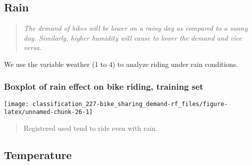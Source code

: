 \documentclass[]{book}
\newenvironment{Shaded}{\begin{snugshade}}{\end{snugshade}}
\newcommand{\DataTypeTok}[1]{\textcolor[rgb]{0.13,0.29,0.53}{#1}}
\newcommand{\DecValTok}[1]{\textcolor[rgb]{0.00,0.00,0.81}{#1}}
\newcommand{\KeywordTok}[1]{\textcolor[rgb]{0.13,0.29,0.53}{\textbf{#1}}}
\newcommand{\NormalTok}[1]{#1}
\newcommand{\OperatorTok}[1]{\textcolor[rgb]{0.81,0.36,0.00}{\textbf{#1}}}
\newcommand{\StringTok}[1]{\textcolor[rgb]{0.31,0.60,0.02}{#1}}
\begin{document}
\hypertarget{rain}{%
\subsection{Rain}\label{rain}}

\begin{quote}
\emph{The demand of bikes will be lower on a rainy day as compared to a sunny day. Similarly, higher humidity will cause to lower the demand and vice versa.}
\end{quote}

We use the variable weather (1 to 4) to analyze riding under rain conditions.

\hypertarget{boxplot-of-rain-effect-on-bike-riding-training-set}{%
\subsubsection{Boxplot of rain effect on bike riding, training set}\label{boxplot-of-rain-effect-on-bike-riding-training-set}}

\begin{Shaded}
\end{Shaded}

\begin{center}\texttt{[image: classification\_227-bike\_sharing\_demand-rf\_files/figure-latex/unnamed-chunk-26-1]} \end{center}

\begin{quote}
Registered used tend to ride even with rain.
\end{quote}

\hypertarget{temperature}{%
\subsection{Temperature}\label{temperature}}
\end{document}
